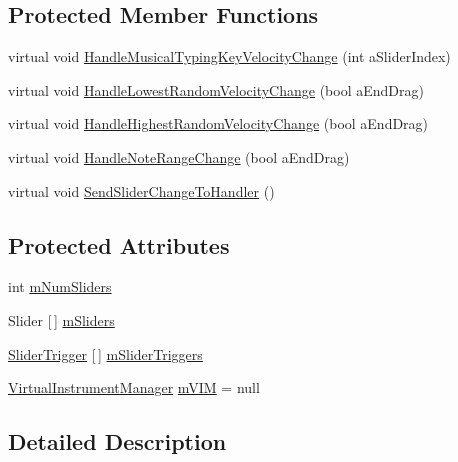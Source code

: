 \subsection*{Protected Member Functions}
\begin{DoxyCompactItemize}
\item 
virtual void \hyperlink{class_a_t_i_1_1_slider_handler_ac82219a0a69f17025d9484f9e45cca80}{Handle\+Musical\+Typing\+Key\+Velocity\+Change} (int a\+Slider\+Index)
\item 
virtual void \hyperlink{class_a_t_i_1_1_slider_handler_a710b59b6e8bf059af76477a930572d9e}{Handle\+Lowest\+Random\+Velocity\+Change} (bool a\+End\+Drag)
\item 
virtual void \hyperlink{class_a_t_i_1_1_slider_handler_a827fab40da8ee6e777cbed4b5a9ae712}{Handle\+Highest\+Random\+Velocity\+Change} (bool a\+End\+Drag)
\item 
virtual void \hyperlink{class_a_t_i_1_1_slider_handler_a4d3915be92feddd4c45027a71c3a338c}{Handle\+Note\+Range\+Change} (bool a\+End\+Drag)
\item 
virtual void \hyperlink{class_a_t_i_1_1_slider_handler_a51fd8e687677af70535a9332ded83d3b}{Send\+Slider\+Change\+To\+Handler} ()
\end{DoxyCompactItemize}
\subsection*{Protected Attributes}
\begin{DoxyCompactItemize}
\item 
int \hyperlink{class_a_t_i_1_1_slider_handler_ac762fad2fb523da79188668dde4488ec}{m\+Num\+Sliders}
\item 
Slider \mbox{[}$\,$\mbox{]} \hyperlink{class_a_t_i_1_1_slider_handler_a038a487fbd701cb786e77c210830be76}{m\+Sliders}
\item 
\hyperlink{class_a_t_i_1_1_slider_trigger}{Slider\+Trigger} \mbox{[}$\,$\mbox{]} \hyperlink{class_a_t_i_1_1_slider_handler_a20208bc52a906cf87aa9df8e5fb2c636}{m\+Slider\+Triggers}
\item 
\hyperlink{class_virtual_instrument_manager}{Virtual\+Instrument\+Manager} \hyperlink{class_a_t_i_1_1_slider_handler_a5d19b4fb92b71c25a667defdda60213f}{m\+V\+IM} = null
\end{DoxyCompactItemize}


\subsection{Detailed Description}


